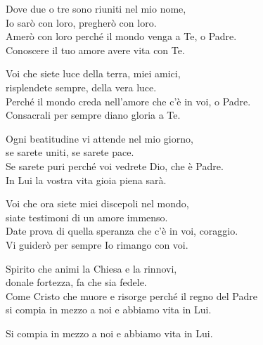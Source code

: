 
\strofa Dove due o tre sono riuniti nel mio nome,\\
Io sarò con loro, pregherò con loro.\\
Amerò con loro perché il mondo venga a Te, o Padre.\\
Conoscere il tuo amore avere vita con Te.

\spazio

\strofa Voi che siete luce della terra, miei amici,\\
risplendete sempre, della vera luce.\\
Perché il mondo creda nell'amore che c'è in voi, o Padre.\\
Consacrali per sempre diano gloria a Te.

\spazio

\strofa Ogni beatitudine vi attende nel mio giorno,\\
se sarete uniti, se sarete pace.\\
Se sarete puri perché voi vedrete Dio, che è Padre.\\
In Lui la vostra vita gioia piena sarà.

\spazio

\strofa Voi che ora siete miei discepoli nel mondo,\\
siate testimoni di un amore immenso.\\
Date prova di quella speranza che c'è in voi, coraggio.\\
Vi guiderò per sempre Io rimango con voi.

\spazio

\strofa Spirito che animi la Chiesa e la rinnovi,\\
donale fortezza, fa che sia fedele.\\
Come Cristo che muore e risorge perché il regno del Padre\\
si compia in mezzo a noi e abbiamo vita in Lui.

\spazio

Si compia in mezzo a noi e abbiamo vita in Lui.